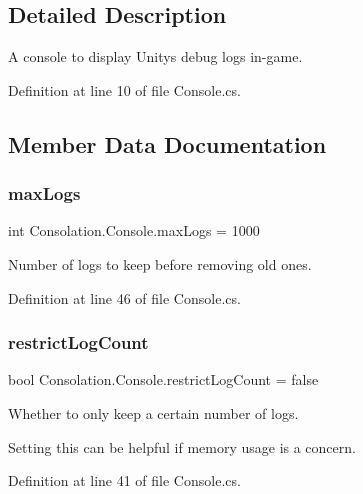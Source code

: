 \subsection{Detailed Description}
A console to display Unity\textquotesingle{}s debug logs in-\/game. 



Definition at line 10 of file Console.\+cs.



\subsection{Member Data Documentation}
\mbox{\label{class_consolation_1_1_console_a2a3269af95bf12bcaec325f4dd54c236}} 
\subsubsection{\texorpdfstring{max\+Logs}{maxLogs}}
{\footnotesize\ttfamily int Consolation.\+Console.\+max\+Logs = 1000}



Number of logs to keep before removing old ones. 



Definition at line 46 of file Console.\+cs.

\mbox{\label{class_consolation_1_1_console_af10997cc4b9782f092b0d82c3733d5b1}} 
\subsubsection{\texorpdfstring{restrict\+Log\+Count}{restrictLogCount}}
{\footnotesize\ttfamily bool Consolation.\+Console.\+restrict\+Log\+Count = false}



Whether to only keep a certain number of logs. 

Setting this can be helpful if memory usage is a concern. 

Definition at line 41 of file Console.\+cs.


